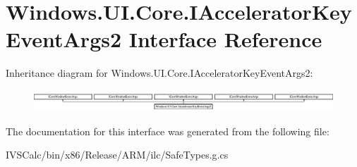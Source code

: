 \hypertarget{interface_windows_1_1_u_i_1_1_core_1_1_i_accelerator_key_event_args2}{}\section{Windows.\+U\+I.\+Core.\+I\+Accelerator\+Key\+Event\+Args2 Interface Reference}
\label{interface_windows_1_1_u_i_1_1_core_1_1_i_accelerator_key_event_args2}
Inheritance diagram for Windows.\+U\+I.\+Core.\+I\+Accelerator\+Key\+Event\+Args2\+:\begin{figure}[H]
\begin{center}
\leavevmode
\includegraphics[height=0.802867cm]{interface_windows_1_1_u_i_1_1_core_1_1_i_accelerator_key_event_args2}
\end{center}
\end{figure}


The documentation for this interface was generated from the following file\+:\begin{DoxyCompactItemize}
\item 
I\+V\+S\+Calc/bin/x86/\+Release/\+A\+R\+M/ilc/Safe\+Types.\+g.\+cs\end{DoxyCompactItemize}

